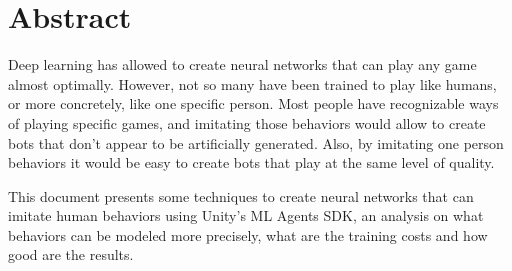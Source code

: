 %
%
%

\chapter*{Abstract}

Deep learning has allowed to create neural networks that can play any game almost optimally. However, not so many have been trained to play like humans, or more concretely, like one specific person. Most people have recognizable ways of playing specific games, and imitating those behaviors would allow to create bots that don't appear to be artificially generated. Also, by imitating one person behaviors it would be easy to create bots that play at the same level of quality.

This document presents some techniques to create neural networks that can imitate human behaviors using Unity's ML Agents SDK, an analysis on what behaviors can be modeled more precisely, what are the training costs and how good are the results.

\cleardoublepage{}
